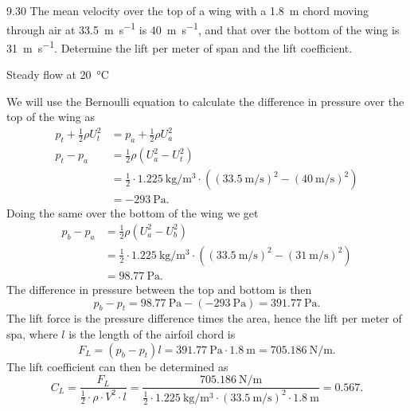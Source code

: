
\begin{problem}{9.30}
  The mean velocity over the top of a wing with a \qty{1,8}{\m} chord moving through air at \qty{33,5}{\m\per\s} is \qty{40}{\m\per\s}, and that over the bottom of the wing is \qty{31}{\m\per\s}.
  Determine the lift per meter of span and the lift coefficient.
\end{problem}

\begin{assumptions}
  \item Steady flow at \qty{20}{\celsius} 
\end{assumptions}

\begin{derivation}
  We will use the Bernoulli equation to calculate the difference in pressure over the top of the wing as
  \begin{align*}
    p_t + \frac{1}{2} \rho U_t^2 &= p_a + \frac{1}{2} \rho U_a^2 \\
    p_t - p_a &= \frac{1}{2} \rho \left( U_a^2 - U_t^2 \right) \\
              &= \frac{1}{2} \cdot \qty{1,225}{\kg\per\cubic\m} \cdot \left( \left( \qty{33,5}{\m\per\s} \right)^2 - \left( \qty{40}{\m\per\s}  \right)^2 \right) \\
              &= \qty{-293}{\Pa} 
  .\end{align*}
  Doing the same over the bottom of the wing we get
  \begin{align*}
    p_b - p_a &= \frac{1}{2} \rho \left( U_a^2 - U_b^2 \right) \\
    &= \frac{1}{2} \cdot \qty{1,225}{\kg\per\cubic\m} \cdot \left( \left( \qty{33,5}{\m\per\s}  \right)^2 - \left( \qty{31}{\m\per\s}  \right)^2 \right) \\
    &= \qty{98,77}{\Pa} 
  .\end{align*}
  The difference in pressure between the top and bottom is then
  \begin{equation*}
    p_b - p_t = \qty{98,77}{\Pa} - \left( \qty{-293}{\Pa}  \right) = \qty{391,77}{\Pa} 
  .\end{equation*}
  The lift force is the pressure difference times the area, hence the lift per meter of spa, where $l$ is the length of the airfoil chord is
  \begin{equation*}
    F_L = \left( p_b - p_t \right) l = \qty{391,77}{\Pa} \cdot \qty{1,8}{\m} = \qty{705,186}{\N\per\m} 
  .\end{equation*}
  The lift coefficient can then be determined as
  \begin{equation*}
    C_L = \frac{F_L}{\frac{1}{2} \cdot \rho \cdot V^2 \cdot l} = \frac{\qty{705,186}{\N\per\m} }{\frac{1}{2}\cdot \qty{1,225}{\kg\per\cubic\m} \cdot \left( \qty{33,5}{\m\per\s}  \right)^2 \cdot \qty{1,8}{\m} } = \num{0,567} 
  .\end{equation*}
  
\end{derivation}

